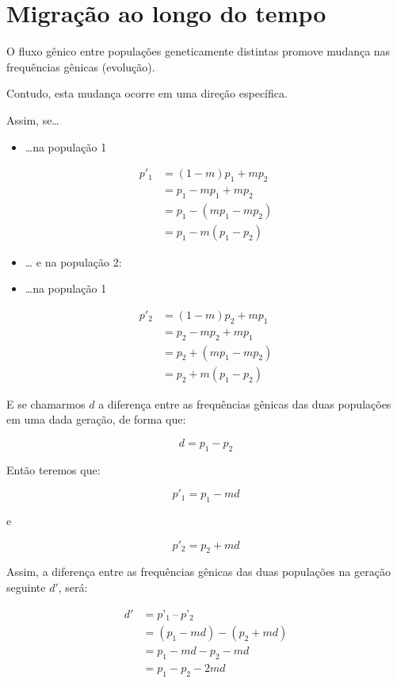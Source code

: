 \documentclass[
]{book}
\providecommand{\tightlist}{%
  \setlength{\itemsep}{0pt}\setlength{\parskip}{0pt}}
\begin{document}
\hypertarget{migrauxe7uxe3o-ao-longo-do-tempo}{%
\section{Migração ao longo do tempo}\label{migrauxe7uxe3o-ao-longo-do-tempo}}

O fluxo gênico entre populações geneticamente distintas promove mudança nas frequências gênicas (evolução).

Contudo, esta mudança ocorre em uma direção específica.

Assim, se\ldots{}

\begin{itemize}
\tightlist
\item
  \ldots na população 1
\end{itemize}

\[
\begin{aligned}
p'_1
&= (1-m)p_1 + mp_2 \\
&= p_1 - mp_1 + mp_2 \\
&= p_1 - (mp_1 - mp_2) \\
&= p_1 - m(p_1 - p_2)
\end{aligned}
\]

\begin{itemize}
\item
  \ldots{} e na população 2:
\item
  \ldots na população 1
\end{itemize}

\[
\begin{aligned}
p'_2
&= (1-m)p_2 + mp_1 \\
&= p_2 - mp_2 + mp_1 \\
&= p_2 + (mp_1 - mp_2) \\
&= p_2 + m(p_1 - p_2)
\end{aligned}
\]

E se chamarmos \(d\) a diferença entre as frequências gênicas das duas populações em uma dada geração, de forma que:

\[ d = p_1 - p_2\]

Então teremos que:

\[p'_1 = p_1 - md\]

e

\[p'_2 = p_2 + md\]

Assim, a diferença entre as frequências gênicas das duas populações na geração seguinte \(d'\), será:

\[
\begin{aligned}
d'
&= p’_1 \ – \ p’_2 \\
&= (p_1 - md) - (p_2 + md) \\
&= p_1 - md - p_2 - md \\
&= p_1 - p_2 - 2md
\end{aligned}
\]
\end{document}
